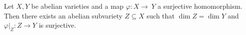 \documentclass[11pt]{article}
\begin{document}
%		

\begin{thm}\label{thm:pcit}
	Let $X,Y$ be abelian varieties and a map $\varphi:X\to~Y$ a surjective homomorphism. Then there exists an abelian subvariety $Z\subseteq X$ such that $\dim Z = \dim Y$ and $\varphi|_Z:Z\to Y$ is surjective.
\end{thm}
\end{document}
